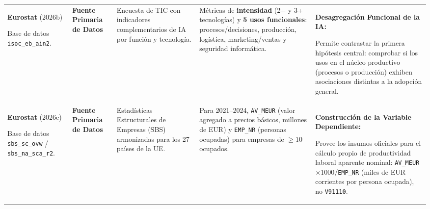 \documentclass[10pt,a4paper,landscape]{article}
\begin{document}
\begin{xltabular}{\textwidth}{@{} L{4.5cm} L{3.3cm} Y Y Y @{}}
  \textbf{Eurostat} (2026b)\par
  Base de datos \texttt{isoc\_eb\_ain2}.\par
  [\texttt{eurostat\_ain2}] &
  \textbf{Fuente Primaria de Datos} &
  Encuesta de TIC con indicadores complementarios de IA por función y tecnología. &
  Métricas de \textbf{intensidad} (2+ y 3+ tecnologías) y \textbf{5 usos funcionales}: procesos/decisiones, producción, logística, marketing/ventas y seguridad informática. &
  \textbf{Desagregación Funcional de la IA:}\par
  Permite contrastar la primera hipótesis central: comprobar si los usos en el núcleo productivo (procesos o producción) exhiben asociaciones distintas a la adopción general. \\
  \textbf{Eurostat} (2026c)\par
  Base de datos \texttt{sbs\_sc\_ovw} / \texttt{sbs\_na\_sca\_r2}.\par
  [\texttt{eurostat\_sbs}] &
  \textbf{Fuente Primaria de Datos} &
  Estadísticas Estructurales de Empresas (SBS) armonizadas para los 27 países de la UE. &
  Para 2021--2024, \texttt{AV\_MEUR} (valor agregado a precios básicos, millones de EUR) y \texttt{EMP\_NR} (personas ocupadas) para empresas de $\ge 10$ ocupados. &
  \textbf{Construcción de la Variable Dependiente:}\par
  Provee los insumos oficiales para el cálculo propio de productividad laboral aparente nominal: \texttt{AV\_MEUR}$\times$1000/\texttt{EMP\_NR} (miles de EUR corrientes por persona ocupada), no \texttt{V91110}. \\


\end{xltabular}
\end{document}
